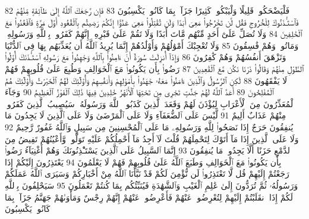{\tiny\colorbox{cl_aya}{82}} فَلْيَضْحَكُوا۟ قَلِيلًا وَلْيَبْكُوا۟ كَثِيرًا جَزَآءًۢ بِمَا كَانُوا۟ يَكْسِبُونَ
{\tiny\colorbox{cl_aya}{83}} فَإِن رَّجَعَكَ ٱللَّهُ إِلَىٰ طَآئِفَةٍ مِّنْهُمْ فَٱسْتَـْٔذَنُوكَ لِلْخُرُوجِ فَقُل لَّن تَخْرُجُوا۟ مَعِىَ أَبَدًا وَلَن تُقَٰتِلُوا۟ مَعِىَ عَدُوًّا إِنَّكُمْ رَضِيتُم بِٱلْقُعُودِ أَوَّلَ مَرَّةٍ فَٱقْعُدُوا۟ مَعَ ٱلْخَٰلِفِينَ
{\tiny\colorbox{cl_aya}{84}} وَلَا تُصَلِّ عَلَىٰٓ أَحَدٍ مِّنْهُم مَّاتَ أَبَدًا وَلَا تَقُمْ عَلَىٰ قَبْرِهِۦٓ إِنَّهُمْ كَفَرُوا۟ بِٱللَّهِ وَرَسُولِهِۦ وَمَاتُوا۟ وَهُمْ فَٰسِقُونَ
{\tiny\colorbox{cl_aya}{85}} وَلَا تُعْجِبْكَ أَمْوَٰلُهُمْ وَأَوْلَٰدُهُمْ إِنَّمَا يُرِيدُ ٱللَّهُ أَن يُعَذِّبَهُم بِهَا فِى ٱلدُّنْيَا وَتَزْهَقَ أَنفُسُهُمْ وَهُمْ كَٰفِرُونَ
{\tiny\colorbox{cl_aya}{86}} وَإِذَآ أُنزِلَتْ سُورَةٌ أَنْ ءَامِنُوا۟ بِٱللَّهِ وَجَٰهِدُوا۟ مَعَ رَسُولِهِ ٱسْتَـْٔذَنَكَ أُو۟لُوا۟ ٱلطَّوْلِ مِنْهُمْ وَقَالُوا۟ ذَرْنَا نَكُن مَّعَ ٱلْقَٰعِدِينَ
{\tiny\colorbox{cl_aya}{87}} رَضُوا۟ بِأَن يَكُونُوا۟ مَعَ ٱلْخَوَالِفِ وَطُبِعَ عَلَىٰ قُلُوبِهِمْ فَهُمْ لَا يَفْقَهُونَ
{\tiny\colorbox{cl_aya}{88}} لَٰكِنِ ٱلرَّسُولُ وَٱلَّذِينَ ءَامَنُوا۟ مَعَهُۥ جَٰهَدُوا۟ بِأَمْوَٰلِهِمْ وَأَنفُسِهِمْ وَأُو۟لَٰٓئِكَ لَهُمُ ٱلْخَيْرَٰتُ وَأُو۟لَٰٓئِكَ هُمُ ٱلْمُفْلِحُونَ
{\tiny\colorbox{cl_aya}{89}} أَعَدَّ ٱللَّهُ لَهُمْ جَنَّٰتٍ تَجْرِى مِن تَحْتِهَا ٱلْأَنْهَٰرُ خَٰلِدِينَ فِيهَا ذَٰلِكَ ٱلْفَوْزُ ٱلْعَظِيمُ
{\tiny\colorbox{cl_aya}{90}} وَجَآءَ ٱلْمُعَذِّرُونَ مِنَ ٱلْأَعْرَابِ لِيُؤْذَنَ لَهُمْ وَقَعَدَ ٱلَّذِينَ كَذَبُوا۟ ٱللَّهَ وَرَسُولَهُۥ سَيُصِيبُ ٱلَّذِينَ كَفَرُوا۟ مِنْهُمْ عَذَابٌ أَلِيمٌ
{\tiny\colorbox{cl_aya}{91}} لَّيْسَ عَلَى ٱلضُّعَفَآءِ وَلَا عَلَى ٱلْمَرْضَىٰ وَلَا عَلَى ٱلَّذِينَ لَا يَجِدُونَ مَا يُنفِقُونَ حَرَجٌ إِذَا نَصَحُوا۟ لِلَّهِ وَرَسُولِهِۦ مَا عَلَى ٱلْمُحْسِنِينَ مِن سَبِيلٍ وَٱللَّهُ غَفُورٌ رَّحِيمٌ
{\tiny\colorbox{cl_aya}{92}} وَلَا عَلَى ٱلَّذِينَ إِذَا مَآ أَتَوْكَ لِتَحْمِلَهُمْ قُلْتَ لَآ أَجِدُ مَآ أَحْمِلُكُمْ عَلَيْهِ تَوَلَّوا۟ وَّأَعْيُنُهُمْ تَفِيضُ مِنَ ٱلدَّمْعِ حَزَنًا أَلَّا يَجِدُوا۟ مَا يُنفِقُونَ
{\tiny\colorbox{cl_aya}{93}} إِنَّمَا ٱلسَّبِيلُ عَلَى ٱلَّذِينَ يَسْتَـْٔذِنُونَكَ وَهُمْ أَغْنِيَآءُ رَضُوا۟ بِأَن يَكُونُوا۟ مَعَ ٱلْخَوَالِفِ وَطَبَعَ ٱللَّهُ عَلَىٰ قُلُوبِهِمْ فَهُمْ لَا يَعْلَمُونَ
{\tiny\colorbox{cl_aya}{94}} يَعْتَذِرُونَ إِلَيْكُمْ إِذَا رَجَعْتُمْ إِلَيْهِمْ قُل لَّا تَعْتَذِرُوا۟ لَن نُّؤْمِنَ لَكُمْ قَدْ نَبَّأَنَا ٱللَّهُ مِنْ أَخْبَارِكُمْ وَسَيَرَى ٱللَّهُ عَمَلَكُمْ وَرَسُولُهُۥ ثُمَّ تُرَدُّونَ إِلَىٰ عَٰلِمِ ٱلْغَيْبِ وَٱلشَّهَٰدَةِ فَيُنَبِّئُكُم بِمَا كُنتُمْ تَعْمَلُونَ
{\tiny\colorbox{cl_aya}{95}} سَيَحْلِفُونَ بِٱللَّهِ لَكُمْ إِذَا ٱنقَلَبْتُمْ إِلَيْهِمْ لِتُعْرِضُوا۟ عَنْهُمْ فَأَعْرِضُوا۟ عَنْهُمْ إِنَّهُمْ رِجْسٌ وَمَأْوَىٰهُمْ جَهَنَّمُ جَزَآءًۢ بِمَا كَانُوا۟ يَكْسِبُونَ
